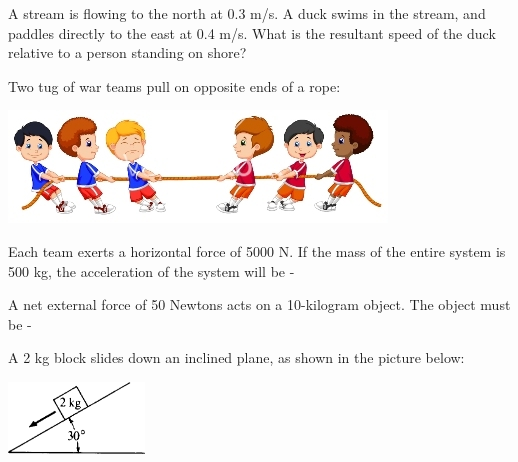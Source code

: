 \documentclass[10pt]{examdesign}
\begin{document}
\begin{multiplechoice} [title={Multiple Choice},
	rearrange=yes]
\begin{question}A stream is flowing to the north at 0.3 m/s.  A duck swims in the stream, and paddles directly to the east at 0.4 m/s. What is the resultant speed of the duck relative to a person standing on shore?  
\end{question}

\begin{question}
	Two tug of war teams pull on opposite ends of a rope:
	
	\begin{center}
			\includegraphics[height={.5in}]{tug.png}
	\end{center}

	
	 Each team exerts a horizontal force of 5000 N.  If the mass of the entire system is 500 kg, the acceleration of the system will be - 
\end{question}




\begin{question}
A net external force of 50 Newtons acts on a 10-kilogram object.  The object must be - 
\end{question}



\begin{question}
	
	A 2 kg block slides down an inclined plane, as shown in the picture below:  
	
	\begin{center}
		\includegraphics[height={0.75in}]{incp.png}
	\end{center}	
	

\end{question}
\end{multiplechoice}
\end{document}
